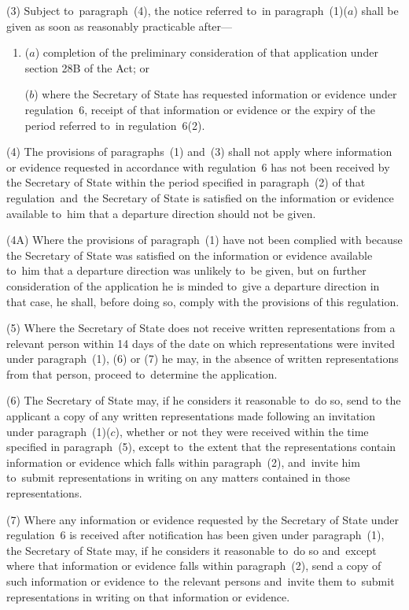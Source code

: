 \documentclass[12pt,a4paper]{article}
\begin{document}
(3) Subject to~paragraph~(4), the notice referred to~in paragraph~(1)($a$) shall
be given as soon as reasonably practicable after—
\begin{enumerate}\item[]
($a$) completion of the preliminary consideration of that application under section
28B of the Act; or

($b$) where the Secretary of State has requested information or evidence under regulation~6, receipt of that information or evidence or the expiry of the period 
referred to~in regulation~6(2).
\end{enumerate}

(4) The provisions of paragraphs~(1) and~(3) shall not apply where information
or evidence requested in accordance with regulation~6 has not been received by
the Secretary of State within the period specified in paragraph~(2) of that
regulation~and~the Secretary of State is satisfied on the information or
evidence available to~him that a departure direction should not be given.

(4A) Where the provisions of paragraph~(1) have not been complied with because the Secretary of State was satisfied on the information or evidence available to~him that a departure direction was unlikely to~be given, but on further consideration of the application he is minded to~give a departure direction in that case, he shall, before doing so, comply with the provisions of this regulation.

(5) Where the Secretary of State does not receive written representations from a
relevant person within 14 days of the date on which representations were invited
under paragraph~(1), (6) or (7) he may, in the absence of written
representations from that person, proceed to~determine the application.

(6) The Secretary of State may, if he considers it reasonable to~do so, send to
the applicant a copy of any written representations made following an invitation
under paragraph~(1)($c$), whether or not they were received within the time
specified in paragraph~(5), except to~the extent that the representations
contain information or evidence which falls within paragraph~(2), and~invite him
to~submit representations in writing on any matters contained in those
representations.

(7) Where any information or evidence requested by the Secretary of State under
regulation~6 is received after notification has been given under paragraph~(1),
the Secretary of State may, if he considers it reasonable to~do so and~except
where that information or evidence falls within paragraph~(2), send a copy of
such information or evidence to~the relevant persons and~invite them to~submit
representations in writing on that information or evidence.
\end{document}
